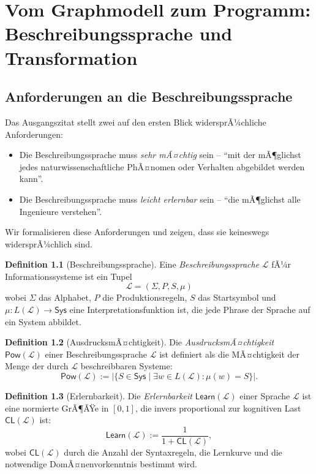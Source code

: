 ﻿\documentclass[a4paper,12pt]{report}
\theoremstyle{definition}
\newtheorem{definition}{Definition}[section]
\begin{document}
\chapter{Vom Graphmodell zum Programm: Beschreibungssprache und Transformation}
\label{ch:vom_modell_zum_programm}
\label{sec:beschreibungssprache}

\section{Anforderungen an die Beschreibungssprache}

Das Ausgangszitat stellt zwei auf den ersten Blick widersprÃ¼chliche Anforderungen:

\begin{itemize}
  \item Die Beschreibungssprache muss \emph{sehr mÃ¤chtig} sein -- \enquote{mit der mÃ¶glichst
        jedes naturwissenschaftliche PhÃ¤nomen oder Verhalten abgebildet werden kann}.
  \item Die Beschreibungssprache muss \emph{leicht erlernbar} sein -- \enquote{die mÃ¶glichst
        alle Ingenieure verstehen}.
\end{itemize}

Wir formalisieren diese Anforderungen und zeigen, dass sie keineswegs widersprÃ¼chlich sind.

\begin{definition}[Beschreibungssprache]
\label{def:beschrsprache}
Eine \emph{Beschreibungssprache} $\mathcal{L}$ fÃ¼r Informationssysteme ist ein Tupel
\[
  \mathcal{L} = (\Sigma, P, S, \mu)
\]
wobei $\Sigma$ das Alphabet, $P$ die Produktionsregeln, $S$ das Startsymbol und
$\mu: L(\mathcal{L}) \to \mathsf{Sys}$ eine Interpretationsfunktion ist, die jede
Phrase der Sprache auf ein System abbildet.
\end{definition}

\begin{definition}[AusdrucksmÃ¤chtigkeit]
\label{def:maechtigkeit}
Die \emph{AusdrucksmÃ¤chtigkeit} $\mathsf{Pow}(\mathcal{L})$ einer Beschreibungssprache
$\mathcal{L}$ ist definiert als die MÃ¤chtigkeit der Menge der durch $\mathcal{L}$
beschreibbaren Systeme:
\[
  \mathsf{Pow}(\mathcal{L}) := |\{S \in \mathsf{Sys} \mid \exists w \in L(\mathcal{L}): \mu(w) = S\}|.
\]
\end{definition}

\begin{definition}[Erlernbarkeit]
\label{def:erlernbarkeit}
Die \emph{Erlernbarkeit} $\mathsf{Learn}(\mathcal{L})$ einer Sprache $\mathcal{L}$ ist eine
normierte GrÃ¶ÃŸe in $[0, 1]$, die invers proportional zur kognitiven Last
$\mathsf{CL}(\mathcal{L})$ ist:
\[
  \mathsf{Learn}(\mathcal{L}) := \frac{1}{1 + \mathsf{CL}(\mathcal{L})},
\]
wobei $\mathsf{CL}(\mathcal{L})$ durch die Anzahl der Syntaxregeln, die
Lernkurve und die notwendige DomÃ¤nenvorkenntnis bestimmt wird.
\end{definition}
\end{document}
